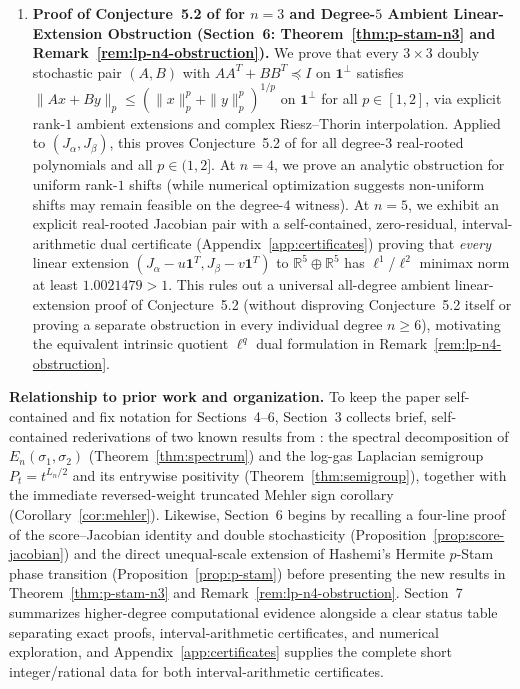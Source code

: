 \documentclass[11pt,a4paper]{article}
\theoremstyle{definition}
\newcommand{\R}{\mathbb{R}}
\newcommand{\one}{\mathbf{1}}
\begin{document}
\begin{enumerate}
\item \textbf{Proof of Conjecture~5.2 of \cite{Hashemi2026} for $n=3$ and Degree-$5$ Ambient Linear-Extension Obstruction (Section~6: Theorem~\ref{thm:p-stam-n3} and Remark~\ref{rem:lp-n4-obstruction}).}
We prove that every $3 \times 3$ doubly stochastic pair $(A,B)$ with $AA^T + BB^T \preceq I$ on $\one^\perp$ satisfies $\|Ax+By\|_p \le (\|x\|_p^p+\|y\|_p^p)^{1/p}$ on $\one^\perp$ for all $p \in [1,2]$, via explicit rank-$1$ ambient extensions and complex Riesz--Thorin interpolation. Applied to $(J_\alpha, J_\beta)$, this proves Conjecture~5.2 of \cite{Hashemi2026} for all degree-$3$ real-rooted polynomials and all $p \in (1,2]$. At $n=4$, we prove an analytic obstruction for uniform rank-$1$ shifts (while numerical optimization suggests non-uniform shifts may remain feasible on the degree-$4$ witness). At $n = 5$, we exhibit an explicit real-rooted Jacobian pair with a self-contained, zero-residual, interval-arithmetic dual certificate (Appendix~\ref{app:certificates}) proving that \emph{every} linear extension $(J_\alpha - u\one^T, J_\beta - v\one^T)$ to $\R^5 \oplus \R^5$ has $\ell^1$/$\ell^2$ minimax norm at least $1.0021479 > 1$. This rules out a universal all-degree ambient linear-extension proof of Conjecture~5.2 (without disproving Conjecture~5.2 itself or proving a separate obstruction in every individual degree $n \ge 6$), motivating the equivalent intrinsic quotient $\ell^q$ dual formulation in Remark~\ref{rem:lp-n4-obstruction}.
\end{enumerate}

\noindent\textbf{Relationship to prior work and organization.} To keep the paper self-contained and fix notation for Sections~4--6, Section~3 collects brief, self-contained rederivations of two known results from \cite{HH2026}: the spectral decomposition of $E_n(\sigma_1,\sigma_2)$ \cite[Theorem~A.1]{HH2026} (Theorem~\ref{thm:spectrum}) and the log-gas Laplacian semigroup $P_t = t^{L_n/2}$ and its entrywise positivity \cite[Theorem~5.1 and Appendix~A]{HH2026} (Theorem~\ref{thm:semigroup}), together with the immediate reversed-weight truncated Mehler sign corollary (Corollary~\ref{cor:mehler}). Likewise, Section~6 begins by recalling a four-line proof of the score--Jacobian identity and double stochasticity \cite[Lemmas~3.2 and~3.4]{GSS2026} (Proposition~\ref{prop:score-jacobian}) and the direct unequal-scale extension of Hashemi's Hermite $p$-Stam phase transition \cite[Proposition~5.5]{Hashemi2026} (Proposition~\ref{prop:p-stam}) before presenting the new results in Theorem~\ref{thm:p-stam-n3} and Remark~\ref{rem:lp-n4-obstruction}. Section~7 summarizes higher-degree computational evidence alongside a clear status table separating exact proofs, interval-arithmetic certificates, and numerical exploration, and Appendix~\ref{app:certificates} supplies the complete short integer/rational data for both interval-arithmetic certificates.
\end{document}
